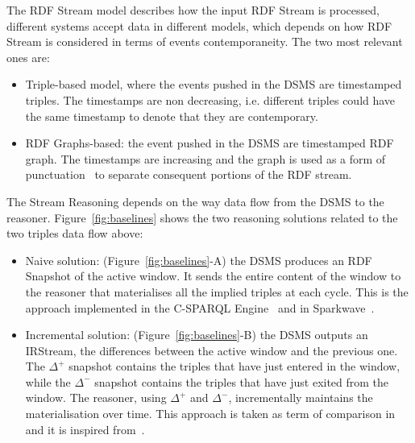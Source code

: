 The RDF Stream model describes how the input RDF Stream is processed, different systems accept data in different models, which depends on how RDF Stream is considered in terms of events contemporaneity. The two most relevant ones are:

\begin{itemize}	
\item Triple-based model, where the events pushed in the DSMS are timestamped triples. The timestamps are non decreasing, i.e. different triples could have the same timestamp to denote that they are contemporary.
\item RDF Graphs-based: the event pushed in the DSMS are timestamped RDF graph. The timestamps are increasing and the graph is used as a form of punctuation~\cite{Tatbul2003b} to separate consequent portions of the RDF stream.
\end{itemize}

The Stream Reasoning depends on the way data flow from the DSMS to the reasoner. Figure~\ref{fig:baselines} shows the two reasoning solutions related to the two triples data flow above:

\begin{itemize}
\item Naive solution: (Figure~\ref{fig:baselines}-A) the DSMS produces an RDF Snapshot of the active window. It sends the entire content of the window to the reasoner that materialises all the implied triples at each cycle. This is the approach implemented in the C-SPARQL Engine~\cite{DBLP:journals/sigmod/BarbieriBCVG10} and in Sparkwave~\cite{DBLP:conf/debs/KomazecCF12}.
\item Incremental solution: (Figure~\ref{fig:baselines}-B) the DSMS outputs an IRStream, the differences between the active window and the previous one. The $\Delta^{+}$ snapshot contains the triples that have just entered in the window, while the $\Delta^{-}$ snapshot contains the triples that have just exited from the window. The reasoner, using $\Delta^{+}$ and $\Delta^{-}$, incrementally maintains the materialisation over time. This approach is taken as term of comparison in~\cite{DellAglio2014} and it is inspired from~\cite{DBLP:conf/cikm/RenP11}.
\end{itemize}

